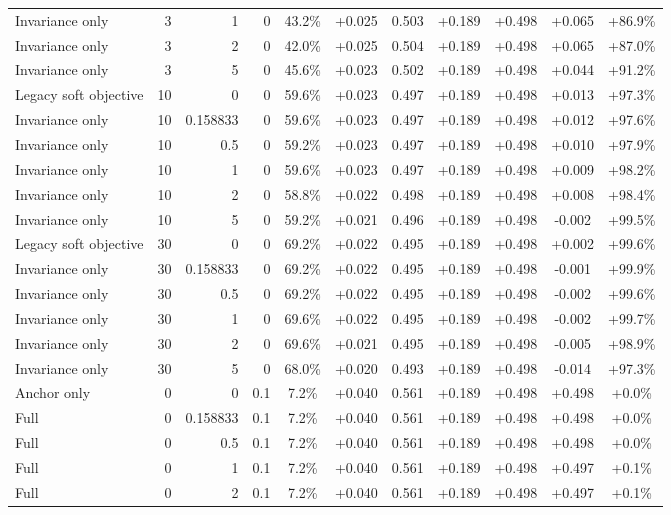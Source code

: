\begin{table}[htbp]
\begin{tabular}{lrrrccccccc}
Invariance only & 3 & 1 & 0 & 43.2\% & +0.025 & 0.503 & +0.189 & +0.498 & +0.065 & +86.9\% \\
Invariance only & 3 & 2 & 0 & 42.0\% & +0.025 & 0.504 & +0.189 & +0.498 & +0.065 & +87.0\% \\
Invariance only & 3 & 5 & 0 & 45.6\% & +0.023 & 0.502 & +0.189 & +0.498 & +0.044 & +91.2\% \\
Legacy soft objective & 10 & 0 & 0 & 59.6\% & +0.023 & 0.497 & +0.189 & +0.498 & +0.013 & +97.3\% \\
Invariance only & 10 & 0.158833 & 0 & 59.6\% & +0.023 & 0.497 & +0.189 & +0.498 & +0.012 & +97.6\% \\
Invariance only & 10 & 0.5 & 0 & 59.2\% & +0.023 & 0.497 & +0.189 & +0.498 & +0.010 & +97.9\% \\
Invariance only & 10 & 1 & 0 & 59.6\% & +0.023 & 0.497 & +0.189 & +0.498 & +0.009 & +98.2\% \\
Invariance only & 10 & 2 & 0 & 58.8\% & +0.022 & 0.498 & +0.189 & +0.498 & +0.008 & +98.4\% \\
Invariance only & 10 & 5 & 0 & 59.2\% & +0.021 & 0.496 & +0.189 & +0.498 & -0.002 & +99.5\% \\
Legacy soft objective & 30 & 0 & 0 & 69.2\% & +0.022 & 0.495 & +0.189 & +0.498 & +0.002 & +99.6\% \\
Invariance only & 30 & 0.158833 & 0 & 69.2\% & +0.022 & 0.495 & +0.189 & +0.498 & -0.001 & +99.9\% \\
Invariance only & 30 & 0.5 & 0 & 69.2\% & +0.022 & 0.495 & +0.189 & +0.498 & -0.002 & +99.6\% \\
Invariance only & 30 & 1 & 0 & 69.6\% & +0.022 & 0.495 & +0.189 & +0.498 & -0.002 & +99.7\% \\
Invariance only & 30 & 2 & 0 & 69.6\% & +0.021 & 0.495 & +0.189 & +0.498 & -0.005 & +98.9\% \\
Invariance only & 30 & 5 & 0 & 68.0\% & +0.020 & 0.493 & +0.189 & +0.498 & -0.014 & +97.3\% \\
Anchor only & 0 & 0 & 0.1 & 7.2\% & +0.040 & 0.561 & +0.189 & +0.498 & +0.498 & +0.0\% \\
Full & 0 & 0.158833 & 0.1 & 7.2\% & +0.040 & 0.561 & +0.189 & +0.498 & +0.498 & +0.0\% \\
Full & 0 & 0.5 & 0.1 & 7.2\% & +0.040 & 0.561 & +0.189 & +0.498 & +0.498 & +0.0\% \\
Full & 0 & 1 & 0.1 & 7.2\% & +0.040 & 0.561 & +0.189 & +0.498 & +0.497 & +0.1\% \\
Full & 0 & 2 & 0.1 & 7.2\% & +0.040 & 0.561 & +0.189 & +0.498 & +0.497 & +0.1\% \\

\end{tabular}
\end{table}
